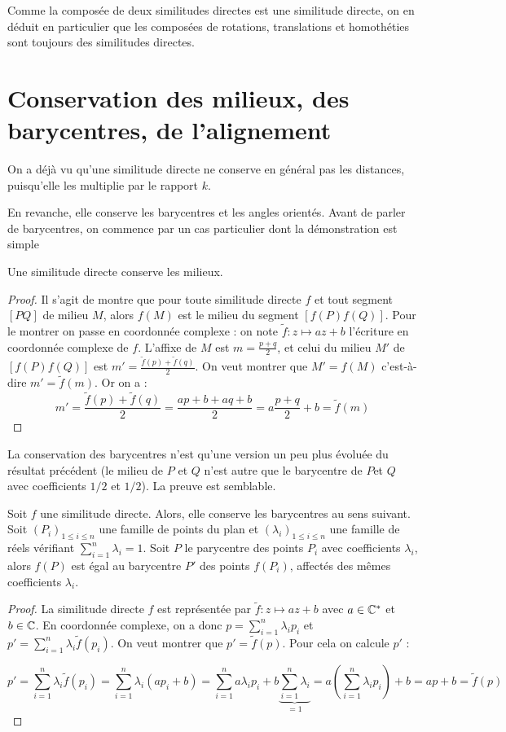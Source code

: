 Comme la composée de deux similitudes directes est une similitude directe, on en déduit en particulier que les composées de rotations, translations et homothéties sont toujours des similitudes directes.




\section{Conservation des milieux, des barycentres, de l'alignement}

On a déjà vu qu'une similitude directe ne conserve en général pas les distances, puisqu'elle les multiplie par le rapport $k$. 

En revanche, elle conserve les barycentres et les angles orientés. Avant de parler de barycentres, on commence par un cas particulier dont la démonstration est simple

\begin{proposition}
Une similitude directe conserve les milieux.
\end{proposition}
\begin{proof}
Il s'agit de montre que pour toute similitude directe $f$ et tout segment $[PQ]$ de milieu $M$, alors $f(M)$ est le milieu du segment $\left[f(P)f(Q)\right]$. Pour le montrer on passe en coordonnée complexe : on note $\tilde f : z\mapsto az+b$  l'écriture en coordonnée complexe de $f$. L'affixe de $M$ est $m=\frac{p+q}{2}$, et celui du milieu $M'$ de $[f(P)f(Q)]$ est $m'=\frac{\tilde f(p)+\tilde f(q)}{2}$. On veut montrer que $M'=f(M)$ c'est-à-dire $m'=\tilde f(m)$. Or on a :
\[
m'
= \frac{\tilde f(p)+\tilde f(q)}{2}
=\frac{ap+b+aq+b}{2}
= a\frac{p+q}{2}+b 
=\tilde f(m)
\]
\end{proof}

La conservation des barycentres n'est qu'une version un peu plus évoluée du résultat précédent (le milieu de $P$ et $Q$ n'est autre que le barycentre de $P$et $Q$ avec coefficients $1/2$ et $1/2$). La preuve est semblable.

\begin{proposition}
Soit $f$ une similitude directe. Alors, elle conserve les barycentres au sens suivant. Soit $(P_i)_{1\leq i\leq n}$ une famille de points du plan et $(\lambda_i)_{1\leq i\leq n}$ une famille de réels vérifiant $\sum_{i=1}^n\lambda_i=1$. Soit $P$ le parycentre des points $P_i$ avec coefficients $\lambda_i$, alors $f(P)$ est égal au barycentre $P'$ des points $f(P_i)$, affectés des mêmes coefficients $\lambda_i$.
\end{proposition}
\begin{proof}
La similitude directe $f$ est représentée par $\tilde f : z\mapsto az+b$ avec $a\in\mathbb{C}^*$ et $b\in\mathbb{C}$.
En coordonnée complexe, on a donc $p=\sum_{i=1}^n \lambda_ip_i$ et $p'=\sum_{i=1}^n \lambda_i\tilde f(p_i)$. On veut montrer que $p'=\tilde f(p)$. Pour cela on calcule $p'$ :

\[ 
p' = \sum_{i=1}^n\lambda_i\tilde f(p_i)
= \sum_{i=1}^n\lambda_i(ap_i+b)
= \sum_{i=1}^n a\lambda_ip_i + b\underbrace{\sum_{i=1}^n\lambda_i}_{=1}
= a\left(\sum_{i=1}^n \lambda_ip_i\right)+b
= ap+b 
= \tilde f(p)  
\]
\end{proof}

